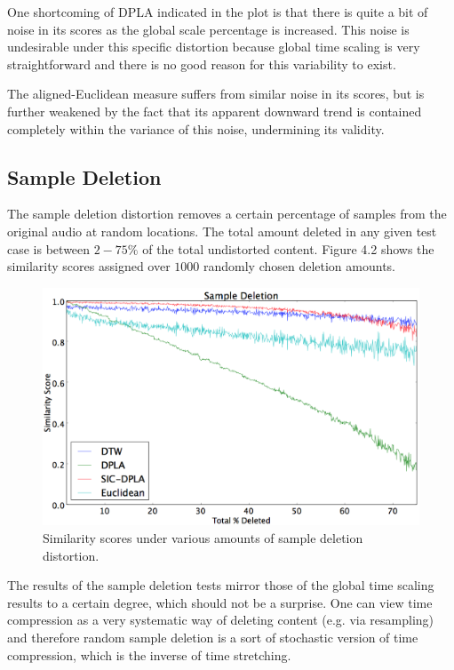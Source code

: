 \documentclass[a4paper,12pt]{report} 	%
\numberwithin{figure}{chapter}
\numberwithin{table}{chapter}
\numberwithin{equation}{chapter}
\begin{document}
\begin{flushleft}
One shortcoming of DPLA indicated in the plot is that there is quite a bit of noise in its scores as the global scale percentage is increased. This noise is undesirable under this specific distortion because global time scaling is very straightforward and there is no good reason for this variability to exist.

The aligned-Euclidean measure suffers from similar noise in its scores, but is further weakened by the fact that its apparent downward trend is contained completely within the variance of this noise, undermining its validity.

\subsection{Sample Deletion}
The sample deletion distortion removes a certain percentage of samples from the original audio at random locations. The total amount deleted in any given test case is between $2-75\%$ of the total undistorted content. Figure 4.2 shows the similarity scores assigned over $1000$ randomly chosen deletion amounts.
\begin{figure}[h!]
\begin{center}
\includegraphics[scale=0.5,width=\linewidth]{SampleDeletion}
\caption[Sample Deletion Results]{Similarity scores under various amounts of sample deletion distortion.}
\end{center}
\end{figure}
The results of the sample deletion tests mirror those of the global time scaling results to a certain degree, which should not be a surprise. One can view time compression as a very systematic way of deleting content (e.g. via resampling) and therefore random sample deletion is a sort of stochastic version of time compression, which is the inverse of time stretching. 


\end{flushleft}
\end{document}
